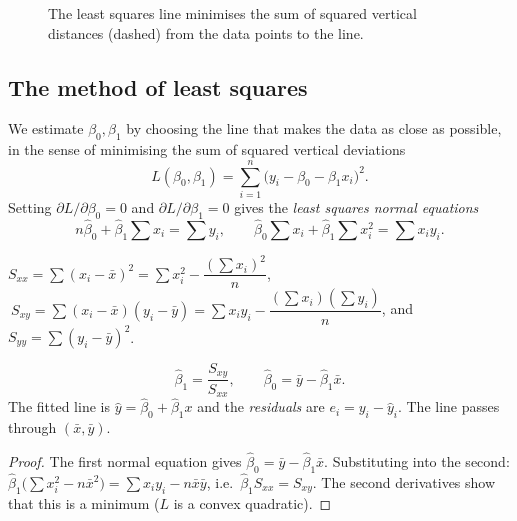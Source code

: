 \begin{figure}[h]
\centering
{}
\caption{The least squares line minimises the sum of squared vertical distances (dashed) from the data points to the line.}
\end{figure}

\subsection*{The method of least squares}

We estimate $\beta_0,\beta_1$ by choosing the line that makes the data as close as possible, in the sense of minimising the sum of squared vertical deviations
\[ L(\beta_0,\beta_1)=\sum_{i=1}^n\big(y_i-\beta_0-\beta_1x_i\big)^2. \]
Setting $\partial L/\partial\beta_0=0$ and $\partial L/\partial\beta_1=0$ gives the \emph{least squares normal equations}
\[ n\hat\beta_0+\hat\beta_1\sum x_i=\sum y_i,\qquad\hat\beta_0\sum x_i+\hat\beta_1\sum x_i^2=\sum x_iy_i. \]

\begin{definition}
$S_{xx}=\sum(x_i-\bar{x})^2=\sum x_i^2-\dfrac{(\sum x_i)^2}n$, $\ S_{xy}=\sum(x_i-\bar{x})(y_i-\bar{y})=\sum x_iy_i-\dfrac{(\sum x_i)(\sum y_i)}n$, and $S_{yy}=\sum(y_i-\bar{y})^2$.
\end{definition}

\begin{theorem}\label{thm:ls}
\[ \hat\beta_1=\frac{S_{xy}}{S_{xx}},\qquad\hat\beta_0=\bar{y}-\hat\beta_1\bar{x}. \]
The fitted line is $\hat{y}=\hat\beta_0+\hat\beta_1x$ and the \emph{residuals} are $e_i=y_i-\hat{y}_i$. The line passes through $(\bar{x},\bar{y})$.
\end{theorem}

\begin{proof}
The first normal equation gives $\hat\beta_0=\bar{y}-\hat\beta_1\bar{x}$. Substituting into the second: $\hat\beta_1\big(\sum x_i^2-n\bar{x}^2\big)=\sum x_iy_i-n\bar{x}\bar{y}$, i.e.\ $\hat\beta_1S_{xx}=S_{xy}$. The second derivatives show that this is a minimum ($L$ is a convex quadratic).
\end{proof}

